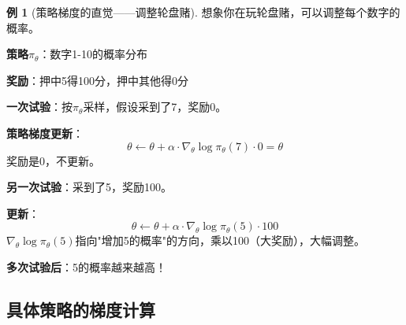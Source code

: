 \documentclass[11pt,a4paper]{article}
\theoremstyle{definition}
\newtheorem{example}{例}[section]
\begin{document}
\begin{example}[策略梯度的直觉——调整轮盘赌]
想象你在玩轮盘赌，可以调整每个数字的概率。

\textbf{策略}$\pi_\theta$：数字1-10的概率分布

\textbf{奖励}：押中5得100分，押中其他得0分

\textbf{一次试验}：按$\pi_\theta$采样，假设采到了7，奖励0。

\textbf{策略梯度更新}：
\[
\theta \leftarrow \theta + \alpha \cdot \nabla_\theta \log \pi_\theta(7) \cdot 0 = \theta
\]
奖励是0，不更新。

\textbf{另一次试验}：采到了5，奖励100。

\textbf{更新}：
\[
\theta \leftarrow \theta + \alpha \cdot \nabla_\theta \log \pi_\theta(5) \cdot 100
\]
$\nabla_\theta \log \pi_\theta(5)$指向"增加5的概率"的方向，乘以100（大奖励），大幅调整。

\textbf{多次试验后}：5的概率越来越高！
\end{example}

\subsection{具体策略的梯度计算}
\end{document}

